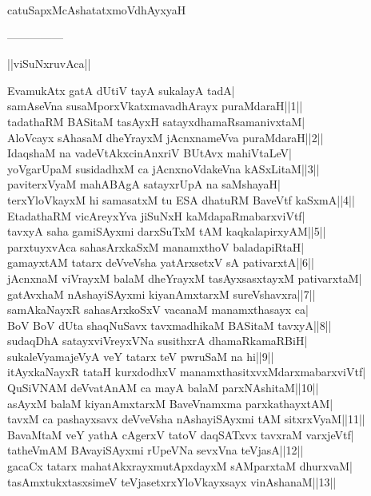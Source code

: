 \documentclass{article}
\begin{document}
\begin{center}
catuSapxMcAshatatxmoVdhAyxyaH
\end{center}

\begin{center}

---------------
\end{center}

\begin{center}
||viSuNxruvAca||
\end{center}

EvamukAtx gatA dUtiV tayA sukalayA tadA|\\
samAseVna susaMporxVkatxmavadhArayx puraMdaraH||1||\\
tadathaRM BASitaM tasAyxH satayxdhamaRsamanivxtaM|\\
AloVcayx sAhasaM dheYrayxM jAcnxnameVva puraMdaraH||2||\\
IdaqshaM na vadeVtAkxcinAnxriV BUtAvx mahiVtaLeV|\\
yoVgarUpaM susidadhxM ca jAcnxnoVdakeVna kASxLitaM||3||\\
paviterxVyaM mahABAgA satayxrUpA na saMshayaH|\\
terxYloVkayxM hi samasatxM tu ESA dhatuRM BaveVtf kaSxmA||4||\\
EtadathaRM vicAreyxYva jiSuNxH kaMdapaRmabarxviVtf|\\
tavxyA saha gamiSAyxmi darxSuTxM tAM kaqkalapirxyAM||5||\\
parxtuyxvAca sahasArxkaSxM manamxthoV baladapiRtaH|\\
gamayxtAM tatarx deVveVsha yatArxsetxV sA pativarxtA||6||\\
jAcnxnaM viVrayxM balaM dheYrayxM tasAyxsasxtayxM pativarxtaM|\\
gatAvxhaM nAshayiSAyxmi kiyanAmxtarxM sureVshavxra||7||\\
samAkaNayxR sahasArxkoSxV vacanaM manamxthasayx ca|\\
BoV BoV dUta shaqNuSavx tavxmadhikaM BASitaM tavxyA||8||\\
sudaqDhA satayxviVreyxVNa susithxrA dhamaRkamaRBiH|\\
sukaleVyamajeVyA veY tatarx teV pwruSaM na hi||9||\\
itAyxkaNayxR tataH kurxdodhxV manamxthasitxvxMdarxmabarxviVtf|\\
QuSiVNAM deVvatAnAM ca mayA balaM parxNAshitaM||10||\\
asAyxM balaM kiyanAmxtarxM BaveVnamxma parxkathayxtAM|\\
tavxM ca pashayxsavx deVveVsha nAshayiSAyxmi tAM sitxrxVyaM||11||\\
BavaMtaM veY yathA cAgerxV tatoV daqSATxvx tavxraM varxjeVtf|\\
tatheVmAM BAvayiSAyxmi rUpeVNa sevxVna teVjasA||12||\\
gacaCx tatarx mahatAkxrayxmutApxdayxM sAMparxtaM dhurxvaM|\\
tasAmxtukxtasxsimeV teVjasetxrxYloVkayxsayx vinAshanaM||13||\\
\end{document}
